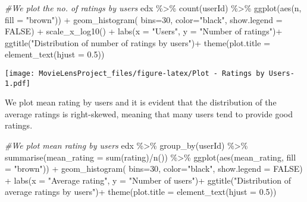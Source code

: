 \documentclass[
]{article}
\newenvironment{Shaded}{\begin{snugshade}}{\end{snugshade}}
\newcommand{\AttributeTok}[1]{\textcolor[rgb]{0.77,0.63,0.00}{#1}}
\newcommand{\CommentTok}[1]{\textcolor[rgb]{0.56,0.35,0.01}{\textit{#1}}}
\newcommand{\ConstantTok}[1]{\textcolor[rgb]{0.00,0.00,0.00}{#1}}
\newcommand{\DecValTok}[1]{\textcolor[rgb]{0.00,0.00,0.81}{#1}}
\newcommand{\FloatTok}[1]{\textcolor[rgb]{0.00,0.00,0.81}{#1}}
\newcommand{\FunctionTok}[1]{\textcolor[rgb]{0.00,0.00,0.00}{#1}}
\newcommand{\NormalTok}[1]{#1}
\newcommand{\SpecialCharTok}[1]{\textcolor[rgb]{0.00,0.00,0.00}{#1}}
\newcommand{\StringTok}[1]{\textcolor[rgb]{0.31,0.60,0.02}{#1}}
\begin{document}
\begin{Shaded}
\begin{Highlighting}[]
\CommentTok{\#We plot the no. of ratings by users}
\NormalTok{edx }\SpecialCharTok{\%\textgreater{}\%} 
  \FunctionTok{count}\NormalTok{(userId) }\SpecialCharTok{\%\textgreater{}\%} 
  \FunctionTok{ggplot}\NormalTok{(}\FunctionTok{aes}\NormalTok{(n, }\AttributeTok{fill =} \StringTok{"brown"}\NormalTok{)) }\SpecialCharTok{+} 
  \FunctionTok{geom\_histogram}\NormalTok{( }\AttributeTok{bins=}\DecValTok{30}\NormalTok{, }\AttributeTok{color=}\StringTok{"black"}\NormalTok{, }\AttributeTok{show.legend =} \ConstantTok{FALSE}\NormalTok{) }\SpecialCharTok{+}
  \FunctionTok{scale\_x\_log10}\NormalTok{() }\SpecialCharTok{+}
  \FunctionTok{labs}\NormalTok{(}\AttributeTok{x =} \StringTok{"Users"}\NormalTok{, }\AttributeTok{y =} \StringTok{"Number of ratings"}\NormalTok{)}\SpecialCharTok{+}
  \FunctionTok{ggtitle}\NormalTok{(}\StringTok{"Distribution of number of ratings by users"}\NormalTok{)}\SpecialCharTok{+}
  \FunctionTok{theme}\NormalTok{(}\AttributeTok{plot.title =} \FunctionTok{element\_text}\NormalTok{(}\AttributeTok{hjust =} \FloatTok{0.5}\NormalTok{))}
\end{Highlighting}
\end{Shaded}

\texttt{[image: MovieLensProject\_files/figure-latex/Plot - Ratings by Users-1.pdf]}

We plot mean rating by users and it is evident that the distribution of
the average ratings is right-skewed, meaning that many users tend to
provide good ratings.

\begin{Shaded}
\begin{Highlighting}[]
\CommentTok{\#We plot mean rating by users}
\NormalTok{edx }\SpecialCharTok{\%\textgreater{}\%} \FunctionTok{group\_by}\NormalTok{(userId) }\SpecialCharTok{\%\textgreater{}\%}
  \FunctionTok{summarise}\NormalTok{(}\AttributeTok{mean\_rating =} \FunctionTok{sum}\NormalTok{(rating)}\SpecialCharTok{/}\FunctionTok{n}\NormalTok{()) }\SpecialCharTok{\%\textgreater{}\%}
  \FunctionTok{ggplot}\NormalTok{(}\FunctionTok{aes}\NormalTok{(mean\_rating, }\AttributeTok{fill =} \StringTok{"brown"}\NormalTok{)) }\SpecialCharTok{+}
  \FunctionTok{geom\_histogram}\NormalTok{( }\AttributeTok{bins=}\DecValTok{30}\NormalTok{, }\AttributeTok{color=}\StringTok{"black"}\NormalTok{, }\AttributeTok{show.legend =} \ConstantTok{FALSE}\NormalTok{) }\SpecialCharTok{+}
  \FunctionTok{labs}\NormalTok{(}\AttributeTok{x =} \StringTok{"Average rating"}\NormalTok{, }\AttributeTok{y =} \StringTok{"Number of users"}\NormalTok{)}\SpecialCharTok{+}
  \FunctionTok{ggtitle}\NormalTok{(}\StringTok{"Distribution of average ratings by users"}\NormalTok{)}\SpecialCharTok{+}
  \FunctionTok{theme}\NormalTok{(}\AttributeTok{plot.title =} \FunctionTok{element\_text}\NormalTok{(}\AttributeTok{hjust =} \FloatTok{0.5}\NormalTok{))}
\end{Highlighting}
\end{Shaded}
\end{document}
